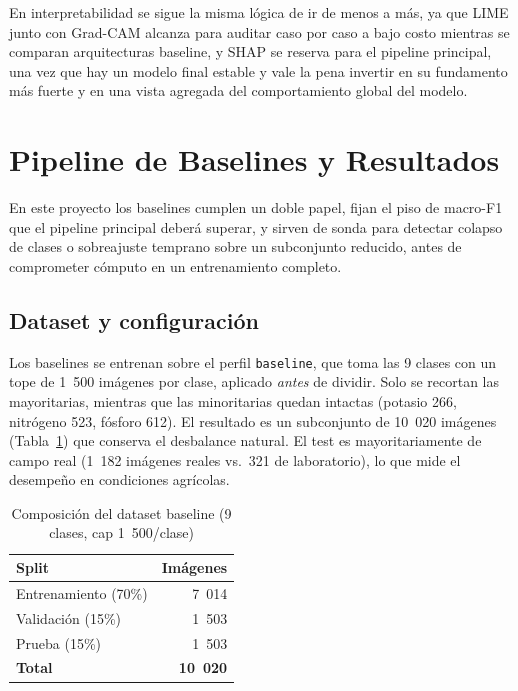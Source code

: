 \documentclass[12pt,letterpaper]{article}
\begin{document}
En interpretabilidad se sigue la misma l\'ogica de ir de menos a m\'as, ya que LIME junto con Grad-CAM alcanza para auditar caso por caso a bajo costo mientras se comparan arquitecturas baseline, y SHAP se reserva para el pipeline principal, una vez que hay un modelo final estable y vale la pena invertir en su fundamento m\'as fuerte y en una vista agregada del comportamiento global del modelo.

\section{Pipeline de Baselines y Resultados}

En este proyecto los baselines cumplen un doble papel, fijan el piso de macro-F1 que el pipeline principal deber\'a superar, y sirven de sonda para detectar colapso de clases o sobreajuste temprano sobre un subconjunto reducido, antes de comprometer c\'omputo en un entrenamiento completo.

\subsection{Dataset y configuraci\'on}

Los baselines se entrenan sobre el perfil \texttt{baseline}, que toma las 9 clases con un tope de 1~500 im\'agenes por clase, aplicado \emph{antes} de dividir. Solo se recortan las mayoritarias, mientras que las minoritarias quedan intactas (potasio 266, nitr\'ogeno 523, f\'osforo 612). El resultado es un subconjunto de 10~020 im\'agenes (Tabla~\ref{tab:baselinesplit}) que conserva el desbalance natural. El test es mayoritariamente de campo real (1~182 im\'agenes reales vs.\ 321 de laboratorio), lo que mide el desempe\~no en condiciones agr\'icolas.

\begin{table}[H]
\caption{Composici\'on del dataset baseline (9 clases, cap 1~500/clase)}
\label{tab:baselinesplit}
\centering
\small
\begin{singlespace}
\begin{tabular}{lr}
\toprule
\textbf{Split} & \textbf{Im\'agenes} \\
\midrule
Entrenamiento (70\%) & 7~014 \\
Validaci\'on (15\%) & 1~503 \\
Prueba (15\%) & 1~503 \\
\midrule
\textbf{Total} & \textbf{10~020} \\
\bottomrule
\end{tabular}
\end{singlespace}
\end{table}
\end{document}
